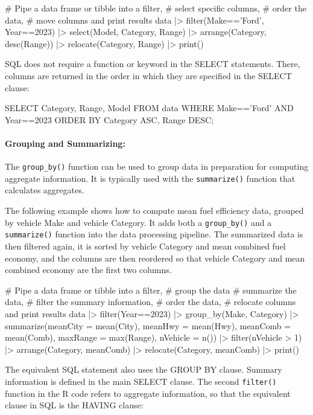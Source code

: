 \begin{Rcode}
# Pipe a data frame or tibble into a filter,
# select specific columns,
# order the data,
# move columns and print results
data |> 
  filter(Make=='Ford', Year==2023) |> 
  select(Model, Category, Range) |>
  arrange(Category, desc(Range)) |>
  relocate(Category, Range) |>
  print()
\end{Rcode}

SQL does not require a function or keyword in the SELECT statements. There, columns are returned in the order in which they are specified in the SELECT clause:

\begin{sqlcode}
SELECT Category, Range, Model
   FROM data 
   WHERE Make=='Ford' AND Year==2023
   ORDER BY Category ASC, Range DESC;
\end{sqlcode}

\paragraph*{Grouping and Summarizing:} The \texttt{group\_by()} function can be used to group data in preparation for computing aggregate information. It is typically used with the \texttt{summarize()} function that calculates aggregates. 

The following example shows how to compute mean fuel efficiency data, grouped by vehicle Make and vehicle Category. It adds both a \texttt{group\_by()} and a \texttt{summarize()} function into the data processing pipeline. The summarized data is then filtered again, it is sorted by vehicle Category and mean combined fuel economy, and the columns are then reordered so that vehicle Category and mean combined economy are the first two columns.

\begin{Rcode}
# Pipe a data frame or tibble into a filter,
# group the data
# summarize the data,
# filter the summary information,
# order the data,
# relocate columns and print results
data |> 
  filter(Year==2023) |> 
  group_by(Make, Category) |>
  summarize(meanCity = mean(City), 
            meanHwy = mean(Hwy),
            meanComb = mean(Comb),
            maxRange = max(Range),
            nVehicle = n()) |>
  filter(nVehicle > 1) |>
  arrange(Category, meanComb) |>
  relocate(Category, meanComb) |>
  print()
\end{Rcode}

The equivalent SQL statement also uses the GROUP BY clause. Summary information is defined in the main SELECT clause. The second \texttt{filter()} function in the R code refers to aggregate information, so that the equivalent clause in SQL is the HAVING clause:

